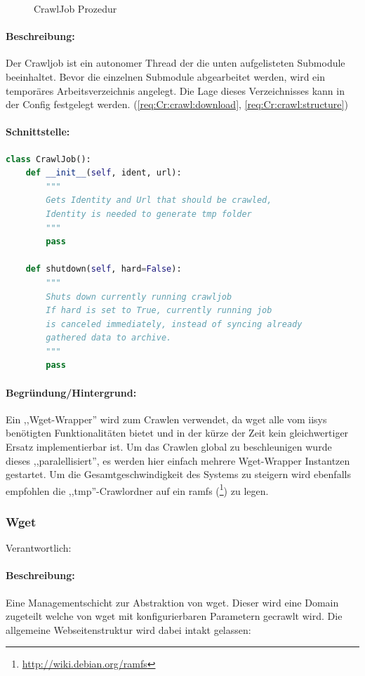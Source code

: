 \begin{figure}[H]
	\caption{CrawlJob Prozedur}
\end{figure}



\paragraph{Beschreibung:}
\label{par:beschreibung_}
Der Crawljob ist ein autonomer Thread der die unten aufgelisteten Submodule beeinhaltet.
Bevor die einzelnen Submodule abgearbeitet werden, wird ein temporäres Arbeitsverzeichnis angelegt.
Die Lage dieses Verzeichnisses kann in der Config festgelegt werden.
(\ref{req:Cr:crawl:download}, \ref{req:Cr:crawl:structure})
\paragraph{Schnittstelle:}
\label{par:api_}
\hfill

\begin{lstlisting}[language=python]
class CrawlJob():
    def __init__(self, ident, url):
        """
        Gets Identity and Url that should be crawled,
        Identity is needed to generate tmp folder
        """
        pass

    def shutdown(self, hard=False): 
        """
        Shuts down currently running crawljob
        If hard is set to True, currently running job
        is canceled immediately, instead of syncing already
        gathered data to archive.
        """
        pass
\end{lstlisting}
\paragraph{Begründung/Hintergrund:}
\label{par:begr_ndung_hintergrund_}
Ein ,,Wget-Wrapper'' wird zum Crawlen verwendet, da wget alle vom iisys benötigten Funktionalitäten bietet und
in der kürze der Zeit kein gleichwertiger Ersatz implementierbar ist. Um das Crawlen global zu 
beschleunigen wurde dieses ,,paralellisiert'', es werden hier einfach mehrere Wget-Wrapper Instantzen gestartet.
Um die Gesamtgeschwindigkeit des Systems zu steigern wird ebenfalls empfohlen die ,,tmp''-Crawlordner auf ein
ramfs (\footnote{\url{http://wiki.debian.org/ramfs}}) zu legen.

\subsubsection{Wget}
\label{ssub:wget}
Verantwortlich: \ci 
\paragraph{Beschreibung:}
\label{par:beschreibung_}
Eine Managementschicht zur Abstraktion von wget.
Dieser wird eine Domain zugeteilt welche von wget mit konfigurierbaren Parametern gecrawlt wird.
Die allgemeine Webseitenstruktur wird dabei intakt gelassen:

